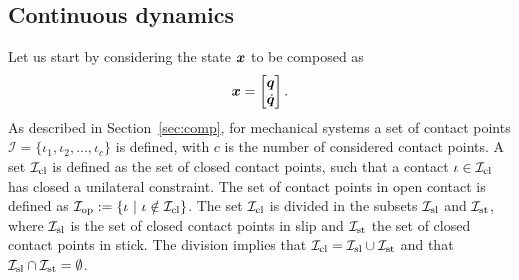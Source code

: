 \documentclass[../DC2017114Bouma.tex]{subfiles}
\begin{document}
\subsection{Continuous dynamics}\label{sec:2contdyn}
Let us start by considering the state ${\boldsymbol{x}}$ to be composed as
\begin{align}
{\boldsymbol{x}} = \begin{bmatrix}
{\boldsymbol{q}}\\ \dot{{\boldsymbol{q}}}
\end{bmatrix}.
\end{align}
As described in Section~\ref{sec:comp}, for mechanical systems a set of contact points $\mathcal{I} = \{\iota_1,\iota_2,\dots,\iota_c\}$ is defined, with $c$ is the number of considered contact points. A set $\mathcal{I}_{\text{cl}}$ is defined as the set of closed contact points, such that a contact $\iota\in\mathcal{I}_{\text{cl}}$ has closed a unilateral constraint. The set of contact points in open contact is defined as $\Ic_{\text{op}} := \{\iota\ |\ \iota\notin\Ic_{\text{cl}}\}$. The set $\mathcal{I}_{\text{cl}}$ is divided in the subsets $\mathcal{I}_{\text{sl}}$ and $\mathcal{I}_{\text{st}}$, where $\mathcal{I}_{\text{sl}}$ is the set of closed contact points in slip and $\mathcal{I}_{\text{st}}$ the set of closed contact points in stick. The division implies that $\mathcal{I}_{\text{cl}} =\mathcal{I}_{\text{sl}}\cup\mathcal{I}_{\text{st}}$ and that $\mathcal{I}_{\text{sl}}\cap\mathcal{I}_{\text{st}}=\emptyset$. 
\end{document}
